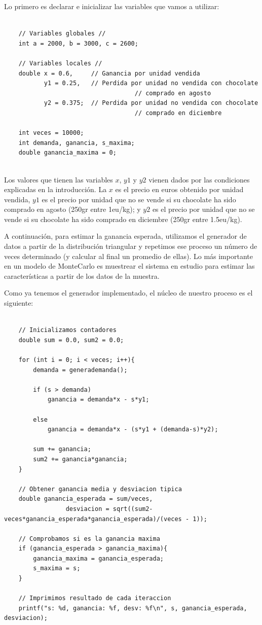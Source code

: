 \documentclass[11pt,a4paper]{article}
\begin{document}
Lo primero es declarar e inicializar las variables que vamos a utilizar:
\begin{lstlisting}

	// Variables globales //
	int a = 2000, b = 3000, c = 2600;

	// Variables locales //
	double x = 0.6,	 	// Ganancia por unidad vendida
		   y1 = 0.25, 	// Perdida por unidad no vendida con chocolate
		   							// comprado en agosto
		   y2 = 0.375;	// Perdida por unidad no vendida con chocolate 
		   							// comprado en diciembre
	
	int veces = 10000;	
	int demanda, ganancia, s_maxima;
	double ganancia_maxima = 0;
	
\end{lstlisting}

Los valores que tienen las variables $x$, $y1$ y $y2$ vienen dados por las condiciones explicadas en la introducción. La $x$ es el precio en euros
obtenido por unidad vendida, $y1$ es el precio por unidad que no se vende si su chocolate ha sido comprado en agosto (250gr entre 1eu/kg); y $y2$ es
el precio por unidad que no se vende si su chocolate ha sido comprado en diciembre (250gr entre 1.5eu/kg).

A continuación, para estimar la ganancia esperada, utilizamos el generador de datos a partir de la distribución triangular y repetimos ese proceso un
número de veces determinado (y calcular al final un promedio de ellas). Lo más importante en un modelo de MonteCarlo es muestrear el sistema en estudio
para estimar las características a partir de los datos de la muestra.

Como ya tenemos el generador implementado, el núcleo de nuestro proceso es el siguiente:
\begin{lstlisting}

	// Inicializamos contadores
	double sum = 0.0, sum2 = 0.0;
		
	for (int i = 0; i < veces; i++){
		demanda = generademanda();

		if (s > demanda)
			ganancia = demanda*x - s*y1;

		else
			ganancia = demanda*x - (s*y1 + (demanda-s)*y2);

		sum += ganancia;
		sum2 += ganancia*ganancia;
	}
	
	// Obtener ganancia media y desviacion tipica
	double ganancia_esperada = sum/veces,
				 desviacion = sqrt((sum2-veces*ganancia_esperada*ganancia_esperada)/(veces - 1));

	// Comprobamos si es la ganancia maxima
	if (ganancia_esperada > ganancia_maxima){
		ganancia_maxima = ganancia_esperada;
		s_maxima = s;
	}

	// Imprimimos resultado de cada iteraccion
	printf("s: %d, ganancia: %f, desv: %f\n", s, ganancia_esperada, desviacion);
	
\end{lstlisting}
\end{document}
